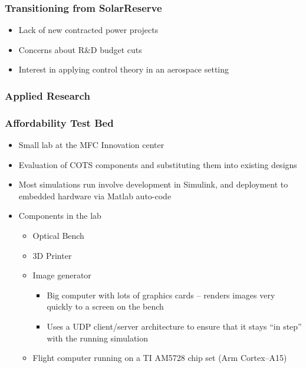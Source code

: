 \documentclass[aspectratio=169]{beamer}
\begin{document}
\begin{frame}
  \frametitle{Transitioning from SolarReserve}
  \begin{itemize}
  \item Lack of new contracted power projects
  \item Concerns about R\&D budget cuts
  \item Interest in applying control theory in an aerospace setting
  \end{itemize}
\end{frame}

\subsubsection{Applied Research}

\begin{frame}
  \frametitle{Affordability Test Bed}
  \begin{itemize}
  \item Small lab at the MFC Innovation center
  \item Evaluation of COTS components and substituting them into
    existing designs
  \item Most simulations run involve development in Simulink, and
    deployment to embedded hardware via Matlab auto-code
  \item Components in the lab
    \begin{itemize}
    \item Optical Bench
    \item 3D Printer
    \item Image generator
      \begin{itemize}
        \item Big computer with lots of graphics cards --
          renders images very quickly to a screen on the bench
        \item Uses a UDP client/server architecture to ensure that it
          stays ``in step'' with the running simulation
      \end{itemize}
    \item Flight computer running on a TI AM5728 chip set (Arm Cortex--A15)
    \end{itemize}
  \end{itemize}
\end{frame}
\end{document}
